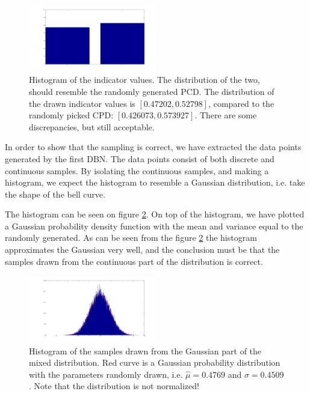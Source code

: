\documentclass[10pt, journal, compsoc, a4paper]{IEEEtran}
\begin{document}
\begin{figure}[ht]
\centering
\includegraphics[width=0.5\textwidth]{figures/fig3.png}                                                                             
\caption{Histogram of the indicator values. The distribution of the two, should resemble the randomly generated PCD. The distribution of the drawn indicator values is $[0.47202,  0.52798]$, compared to the randomly picked CPD: $[0.426073, 0.573927]$. There are some discrepancies, but still acceptable.}
\label{fig3}
\end{figure}

In order to show that the sampling is correct, we have extracted the data points generated by the first DBN. The data points consist of both discrete and continuous samples. By isolating the continuous samples, and making a histogram, we expect the histogram to resemble a Gaussian distribution, i.e. take the shape of the bell curve. 

The histogram can be seen on figure \ref{fig1}. On top of the histogram, we have plotted a Gaussian probability density function with the mean and variance equal to the randomly generated. As can be seen from the figure \ref{fig1} the histogram approximates the Gaussian very well, and the conclusion must be that the samples drawn from the continuous part of the distribution is correct.

\begin{figure}
\centering
\includegraphics[width=0.5\textwidth]{figures/fig1.png}
\caption{Histogram of the samples drawn from the Gaussian part of the mixed distribution. Red curve is a Gaussian probability distribution with the parameters randomly drawn, i.e. $\hat{\mu} = 0.4769$ and $\sigma = 0.4509$. Note that the distribution is not normalized!}
\label{fig1}
\end{figure}
\end{document}
